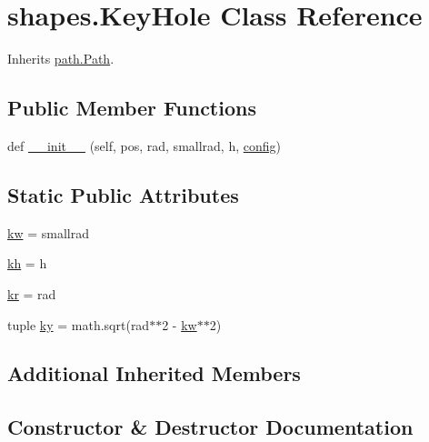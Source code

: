 \hypertarget{classshapes_1_1_key_hole}{}\section{shapes.\+Key\+Hole Class Reference}
\label{classshapes_1_1_key_hole}


Inherits \hyperlink{classpath_1_1_path}{path.\+Path}.

\subsection*{Public Member Functions}
\begin{DoxyCompactItemize}
\item 
def \hyperlink{classshapes_1_1_key_hole_a4ee98943c2657427edc29b474e950e2c}{\+\_\+\+\_\+init\+\_\+\+\_\+} (self, pos, rad, smallrad, h, \hyperlink{classpath_1_1_path_a889e352f02dba833077975ce855276ed}{config})
\end{DoxyCompactItemize}
\subsection*{Static Public Attributes}
\begin{DoxyCompactItemize}
\item 
\hyperlink{classshapes_1_1_key_hole_a31590b3a5db61a40e63796078c22def8}{kw} = smallrad
\item 
\hyperlink{classshapes_1_1_key_hole_a27b3c27c4e6fd8faa8cda12afea87b15}{kh} = h
\item 
\hyperlink{classshapes_1_1_key_hole_a46f3432dd350ca5051ac62cba9ab6ea0}{kr} = rad
\item 
tuple \hyperlink{classshapes_1_1_key_hole_a544f4cb7ddd5fddf07266fe47f78f667}{ky} = math.\+sqrt(rad$\ast$$\ast$2 -\/ \hyperlink{classshapes_1_1_key_hole_a31590b3a5db61a40e63796078c22def8}{kw}$\ast$$\ast$2)
\end{DoxyCompactItemize}
\subsection*{Additional Inherited Members}


\subsection{Constructor \& Destructor Documentation}
\hypertarget{classshapes_1_1_key_hole_a4ee98943c2657427edc29b474e950e2c}{}
